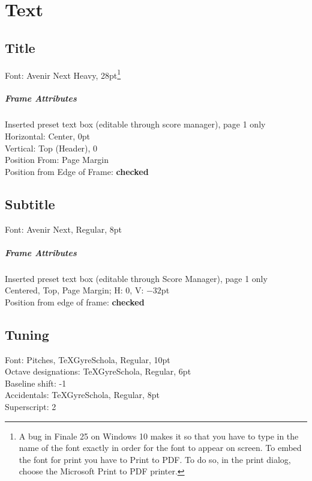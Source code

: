 \documentclass[]{memoir}
\begin{document}
\chapter{Text}
\section{Title}
Font: Avenir Next Heavy, 28pt\footnote{A bug in Finale 25 on Windows
  10 makes it so that you have to type in the name of the font exactly
  in order for the font to appear on screen. To embed the font for
  print you have to Print to PDF. To do so, in the print dialog,
  choose the Microsoft Print to PDF printer.}

\paragraph{Frame Attributes}
Inserted preset text box (editable through score manager), page 1 only\\
Horizontal: Center, 0pt\\
Vertical: Top (Header), 0\\
Position From: Page Margin\\
Position from Edge of Frame: \textbf{checked}

\section{Subtitle}
\label{sec:subtitle}

Font: Avenir Next, Regular, 8pt

\paragraph{Frame Attributes}
\label{sec:frame-attributes}

Inserted preset text box (editable through Score Manager), page 1 only\\
Centered, Top, Page Margin; H: 0, V: $-32$pt\\
Position from edge of frame: \textbf{checked}

\section{Tuning}
\label{sec:tuning}

Font: Pitches, TeXGyreSchola, Regular, 10pt\\
\indent Octave designations: TeXGyreSchola, Regular, 6pt\\
\indent Baseline shift: -1\\
Accidentals: TeXGyreSchola, Regular, 8pt\\
\indent Superscript: 2
\end{document}
